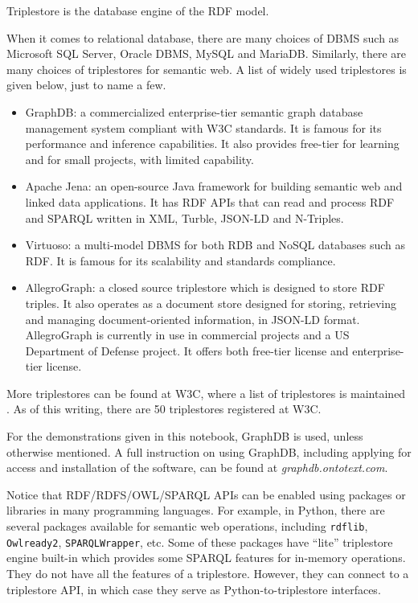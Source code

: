 Triplestore is the database engine of the RDF model. 

When it comes to relational database, there are many choices of DBMS such as Microsoft SQL Server, Oracle DBMS, MySQL and MariaDB. Similarly, there are many choices of triplestores for semantic web. A list of widely used triplestores is given below, just to name a few.
\begin{itemize}
	\item GraphDB: a commercialized enterprise-tier semantic graph database management system compliant with W3C standards. It is famous for its performance and inference capabilities. It also provides free-tier for learning and for small projects, with limited capability.
	\item Apache Jena: an open-source Java framework for building semantic web and linked data applications. It has RDF APIs that can read and process RDF and SPARQL written in XML, Turble, JSON-LD and N-Triples.
	\item Virtuoso: a multi-model DBMS for both RDB and NoSQL databases such as RDF. It is famous for its scalability and standards compliance.
	\item AllegroGraph: a closed source triplestore which is designed to store RDF triples. It also operates as a document store designed for storing, retrieving and managing document-oriented information, in JSON-LD format. AllegroGraph is currently in use in commercial projects and a US Department of Defense project. It offers both free-tier license and enterprise-tier license.
\end{itemize}

More triplestores can be found at W3C, where a list of triplestores is maintained \cite{triplestore,largetriplestore}. As of this writing, there are 50 triplestores registered at W3C.

For the demonstrations given in this notebook, GraphDB is used, unless otherwise mentioned. A full instruction on using GraphDB, including applying for access and installation of the software, can be found at \textit{graphdb.ontotext.com}.

Notice that RDF/RDFS/OWL/SPARQL APIs can be enabled using packages or libraries in many programming languages. For example, in Python, there are several packages available for semantic web operations, including \verb|rdflib|, \verb|Owlready2|, \verb|SPARQLWrapper|, etc. Some of these packages have ``lite'' triplestore engine built-in which provides some SPARQL features for in-memory operations. They do not have all the features of a triplestore. However, they can connect to a triplestore API, in which case they serve as Python-to-triplestore interfaces.


